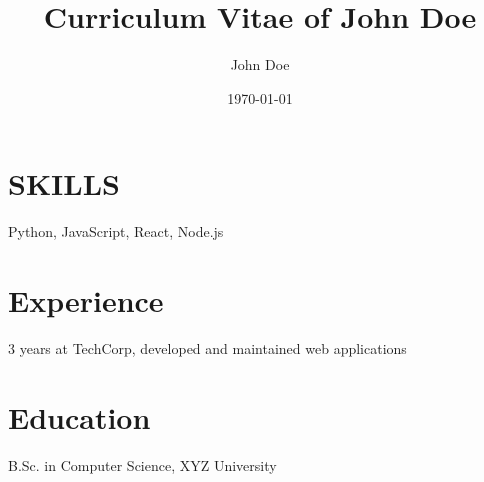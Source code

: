 \documentclass[12pt]{article} %
\begin{document}
\title{Curriculum Vitae of John Doe}
\author{John Doe}

\date{\today} %

\maketitle %

\section*{\uppercase{Skills}}
Python, JavaScript, React, Node.js

\section*{Experience}
3 years at TechCorp, developed and maintained web applications

\section*{Education}
B.Sc. in Computer Science, XYZ University

\end{document}
